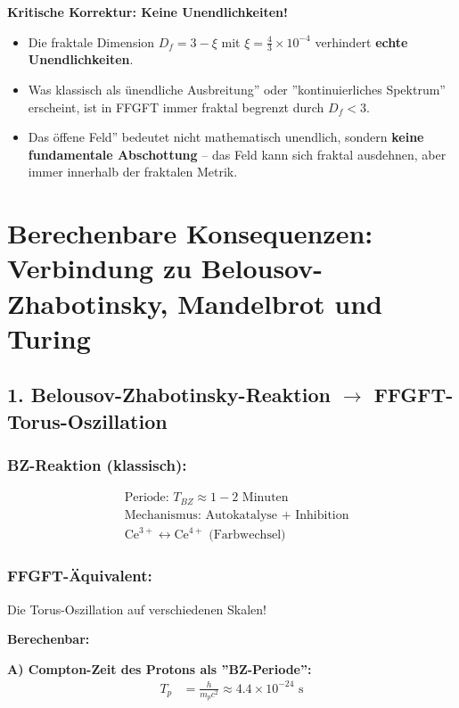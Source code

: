 \documentclass[12pt,a4paper]{article}
\begin{document}
	\textbf{Kritische Korrektur: Keine Unendlichkeiten!}
	\begin{itemize}[label=$\bullet$]
		\item Die fraktale Dimension $D_f = 3 - \xi$ mit $\xi = \frac{4}{3} \times 10^{-4}$ verhindert \textbf{echte Unendlichkeiten}.
		\item Was klassisch als ünendliche Ausbreitung'' oder ''kontinuierliches Spektrum'' erscheint, ist in FFGFT immer fraktal begrenzt durch $D_f < 3$.
		\item Das öffene Feld'' bedeutet nicht mathematisch unendlich, sondern \textbf{keine fundamentale Abschottung} – das Feld kann sich fraktal ausdehnen, aber immer innerhalb der fraktalen Metrik.
	\end{itemize}
	
	\section*{Berechenbare Konsequenzen: Verbindung zu Belousov-Zhabotinsky, Mandelbrot und Turing}
	
	\subsection*{1. Belousov-Zhabotinsky-Reaktion $\rightarrow$ FFGFT-Torus-Oszillation}
	
	\subsubsection*{BZ-Reaktion (klassisch):}
	\begin{align*}
		&\text{Periode: } T_{BZ} \approx 1-2 \text{ Minuten} \\
		&\text{Mechanismus: Autokatalyse + Inhibition} \\
		&\text{Ce}^{3+} \longleftrightarrow \text{Ce}^{4+} \text{ (Farbwechsel)}
	\end{align*}
	
	\subsubsection*{FFGFT-Äquivalent:}
	Die Torus-Oszillation auf verschiedenen Skalen!
	
	\textbf{Berechenbar:}
	
	\textbf{A) Compton-Zeit des Protons als ''BZ-Periode'':}
	\begin{align*}
		T_p &= \frac{h}{m_p c^2} \approx 4.4 \times 10^{-24} \text{ s}
	\end{align*}
	
\end{document}

